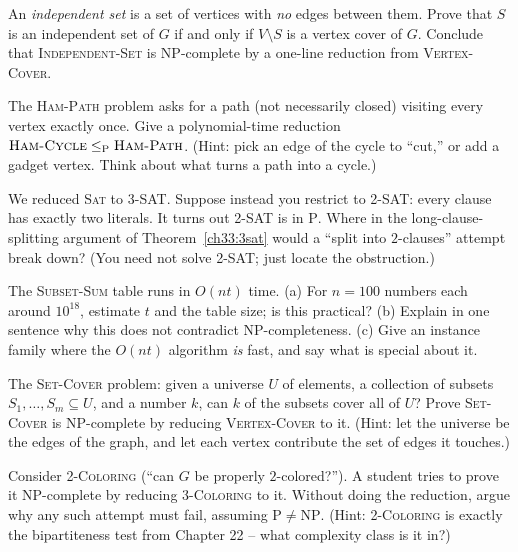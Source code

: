 \begin{exercise}
An \emph{independent set} is a set of vertices with \emph{no} edges between them.
Prove that $S$ is an independent set of $G$ if and only if $V\setminus S$ is a
vertex cover of $G$. Conclude that \textsc{Independent-Set} is NP-complete by a
one-line reduction from \textsc{Vertex-Cover}.
\end{exercise}

\begin{exercise}
The \textsc{Ham-Path} problem asks for a path (not necessarily closed) visiting
every vertex exactly once. Give a polynomial-time reduction
$\textsc{Ham-Cycle}\le_{\mathrm P}\textsc{Ham-Path}$. (Hint: pick an edge of the
cycle to ``cut,'' or add a gadget vertex. Think about what turns a path into a
cycle.)
\end{exercise}

\begin{exercise}
We reduced \textsc{Sat} to \textsc{3-SAT}. Suppose instead you restrict to
\textsc{2-SAT}: every clause has exactly two literals. It turns out \textsc{2-SAT}
is in $\mathrm{P}$. Where in the long-clause-splitting argument of
Theorem~\ref{ch33:3sat} would a ``split into $2$-clauses'' attempt break down?
(You need not solve \textsc{2-SAT}; just locate the obstruction.)
\end{exercise}

\begin{exercise}
The \textsc{Subset-Sum} table runs in $O(nt)$ time. (a) For $n=100$ numbers each
around $10^{18}$, estimate $t$ and the table size; is this practical? (b) Explain
in one sentence why this does not contradict NP-completeness. (c) Give an instance
family where the $O(nt)$ algorithm \emph{is} fast, and say what is special about
it.
\end{exercise}

\begin{exercise}
The \textsc{Set-Cover} problem: given a universe $U$ of elements, a collection of
subsets $S_1,\dots,S_m\subseteq U$, and a number $k$, can $k$ of the subsets cover
all of $U$? Prove \textsc{Set-Cover} is NP-complete by reducing
\textsc{Vertex-Cover} to it. (Hint: let the universe be the edges of the graph,
and let each vertex contribute the set of edges it touches.)
\end{exercise}

\begin{exercise}
Consider \textsc{2-Coloring} (``can $G$ be properly $2$-colored?''). A student
tries to prove it NP-complete by reducing \textsc{3-Coloring} to it. Without doing
the reduction, argue why any such attempt must fail, assuming
$\mathrm{P}\ne\mathrm{NP}$. (Hint: \textsc{2-Coloring} is exactly the
bipartiteness test from Chapter 22 -- what complexity class is it in?)
\end{exercise}

